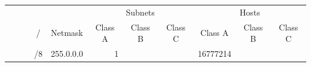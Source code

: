 \documentclass[11pt,a4paper]{article}
\begin{document}
\begin{table}[h]
\centering
{}
\begin{tabular}{cc|c|c|l|r|r|r|r|r|r|} 
\hhline{~~~~~------|}
                                                                                                                                        & \multicolumn{1}{c}{}                                                             & \multicolumn{1}{c}{}                                                        & \multicolumn{1}{c}{}                    &                                                               & \multicolumn{3}{c|}{{\cellcolor[rgb]{0.91,0.91,0.91}}Subnets}                                                                                                                                 & \multicolumn{3}{c|}{{\cellcolor[rgb]{0.91,0.91,0.91}}Hosts}                                                                                                                                    \\ 
\hhline{~~~--------|}
                                                                                                                                        & \multicolumn{1}{c}{}                                                             &                                                                             & {\cellcolor[rgb]{0.91,0.91,0.91}}/      & \multicolumn{1}{c|}{{\cellcolor[rgb]{0.91,0.91,0.91}}Netmask} & \multicolumn{1}{c|}{{\cellcolor[rgb]{0.91,0.91,0.91}}Class A} & \multicolumn{1}{c|}{{\cellcolor[rgb]{0.91,0.91,0.91}}Class B} & \multicolumn{1}{c|}{{\cellcolor[rgb]{0.91,0.91,0.91}}Class C} & \multicolumn{1}{c|}{{\cellcolor[rgb]{0.91,0.91,0.91}}Class A} & \multicolumn{1}{c|}{{\cellcolor[rgb]{0.91,0.91,0.91}}Class B} & \multicolumn{1}{c|}{{\cellcolor[rgb]{0.91,0.91,0.91}}Class C}  \\ 
\hhline{~~---------|}
                                                                                                                                        &                                                                                  & {\cellcolor[rgb]{1,0.89,0.827}}                                             & {\cellcolor[rgb]{1,0.89,0.827}}/8       & {\cellcolor[rgb]{1,0.89,0.827}}255.0.0.0                      & {\cellcolor[rgb]{1,0.89,0.827}}1                              &                                                               &                                                               & {\cellcolor[rgb]{1,0.89,0.827}}16777214                       &                                                               &                                                                \\ 

\end{tabular}
\end{table}
\end{document}
